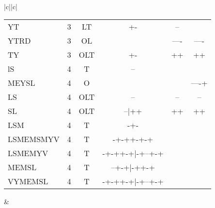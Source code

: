 \documentclass[table,
12pt, %
a4paper, %
oneside, %
headinclude,footinclude, %
BCOR5mm, %
]{scrartcl}
\begin{document}
\begin{table}[htbp]
\begin{adjustbox}{width=\textwidth,center}
\begin{tabular}{|c||c|}
\begin{tabular}{l ccccc}
        YT        & 3   & LT          & +-              & --     &        \\
        YTRD      & 3   & OL          &                 & ----   & ----   \\
        TY        & 3   & OLT         & +-              & ++     & ++     \\
        \rowcolor{shadecolor}
        lS        & 4   & T           & --              &        &        \\
        \rowcolor{white}
        MEYSL     & 4   & O           &                 &        & ----+  \\
        LS        & 4   & OLT         & --              & --     & --     \\
        SL        & 4   & OLT         & --|++           & ++     & ++     \\
        LSM       & 4   & T           & -+-             &        &        \\
        LSMEMSMYV & 4   & T           & -+-++-+-+       &        &        \\
        LSMEMYV   & 4   & T           & -+-++-+|-+--+-+ &        &        \\
        MEMSL     & 4   & T           & --+-+|-++-+     &        &        \\
        VYMEMSL   & 4   & T           & -+-++-+|-+--+-+ &        &        \\
      \end{tabular} &


\end{tabular}
\end{adjustbox}
\end{table}
\end{document}
